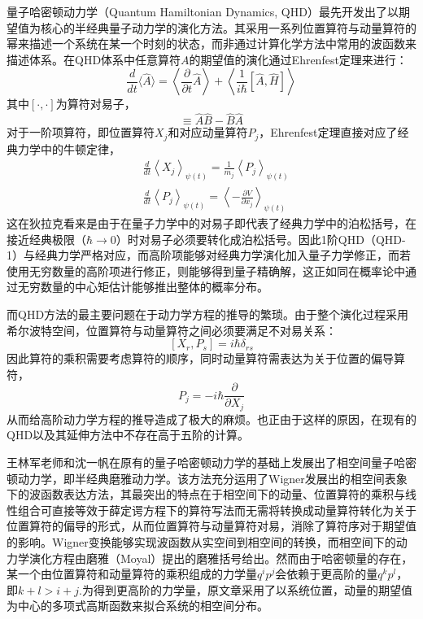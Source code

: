 量子哈密顿动力学（Quantum Hamiltonian Dynamics, QHD）最先开发出了以期望值为核心的半经典量子动力学的演化方法\cite{OlegQHD}。其采用一系列位置算符与动量算符的幂来描述一个系统在某一个时刻的状态，而非通过计算化学方法中常用的波函数来描述体系。在QHD体系中任意算符$A$的期望值的演化通过Ehrenfest定理来进行：
\begin{equation}
	\frac{d}{d t}\langle\hat{A}\rangle=\left\langle\frac{\partial}{\partial t} \hat{A}\right\rangle+\left\langle\frac{1}{i \hbar}[\hat{A}, \hat{H}]\right\rangle
\end{equation}
其中$[\cdot, \cdot]$为算符对易子，
\begin{equation}
	[\hat{A}, \hat{B}] \equiv \hat{A}\hat{B} - \hat{B} \hat{A}
\end{equation}
对于一阶项算符，即位置算符$X_j$和对应动量算符$P_j$，Ehrenfest定理直接对应了经典力学中的牛顿定律，
\begin{equation}
\begin{aligned}
&\frac{d}{d t}\left\langle X_{j}\right\rangle_{\psi(t)}=\frac{1}{m_{j}}\left\langle P_{j}\right\rangle_{\psi(t)}\\
&\frac{d}{d t}\left\langle P_{j}\right\rangle_{\psi(t)}=\left\langle-\frac{\partial V}{\partial x_{j}}\right\rangle_{\psi(t)}
\end{aligned}
\end{equation}
这在狄拉克看来是由于在量子力学中的对易子即代表了经典力学中的泊松括号，在接近经典极限（$\hbar \rightarrow 0$）时对易子必须要转化成泊松括号\cite{dirac1981principles}。因此1阶QHD（QHD-1）与经典力学严格对应，而高阶项能够对经典力学演化加入量子力学修正，而若使用无穷数量的高阶项进行修正，则能够得到量子精确解，这正如同在概率论中通过无穷数量的中心矩估计能够推出整体的概率分布\cite{fisz2018probability}。

而QHD方法的最主要问题在于动力学方程的推导的繁琐。由于整个演化过程采用希尔波特空间，位置算符与动量算符之间必须要满足不对易关系：
\begin{equation}
	\left[X_{r}, P_{s}\right]= i\hbar \delta_{r s}
\end{equation}
因此算符的乘积需要考虑算符的顺序，同时动量算符需表达为关于位置的偏导算符，
\begin{equation}
	P_j = - i \hbar \frac{\partial}{\partial X_j}
\end{equation}
从而给高阶动力学方程的推导造成了极大的麻烦。也正由于这样的原因，在现有的QHD以及其延伸方法中不存在高于五阶的计算。

王林军老师和沈一帆在原有的量子哈密顿动力学的基础上发展出了相空间量子哈密顿动力学，即半经典磨雅动力学\cite{YifanShenPSQHD,LinjunSemiclassical}。该方法充分运用了Wigner发展出的相空间表象下的波函数表达方法，其最突出的特点在于相空间下的动量、位置算符的乘积与线性组合可直接等效于薛定谔方程下的算符写法而无需将转换成动量算符转化为关于位置算符的偏导的形式\cite{wigner1997quantum}，从而位置算符与动量算符对易，消除了算符序对于期望值的影响。Wigner变换能够实现波函数从实空间到相空间的转换，而相空间下的动力学演化方程由磨雅（Moyal）提出的磨雅括号给出\cite{moyal1949quantum}。然而由于哈密顿量的存在，某一个由位置算符和动量算符的乘积组成的力学量$q^i p^j$会依赖于更高阶的量$q^k p^l$，即$k+l > i+j$.为得到更高阶的力学量，原文章采用了以系统位置，动量的期望值为中心的多项式高斯函数来拟合系统的相空间分布。

